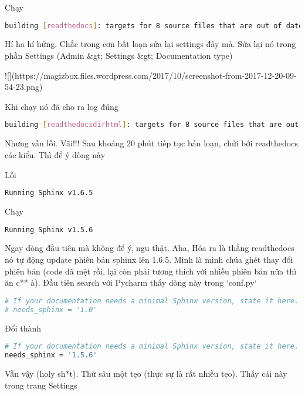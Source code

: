 Chạy

\begin{lstlisting}[language=bash]
building [readthedocs]: targets for 8 source files that are out of date
\end{lstlisting}

Hí ha hí hửng. Chắc trong cơn bất loạn sửa lại settings đây mà. Sửa lại nó trong phần Settings (Admin &gt; Settings &gt; Documentation type)

![](https://magizbox.files.wordpress.com/2017/10/screenshot-from-2017-12-20-09-54-23.png)

Khi chạy nó đã cho ra log đúng

\begin{lstlisting}[language=bash]
building [readthedocsdirhtml]: targets for 8 source files that are out of date
\end{lstlisting}

Nhưng vẫn lỗi. Vãi!!! Sau khoảng 20 phút tiếp tục bấn loạn, chửi bới readthedocs các kiểu. Thì để ý dòng này

Lỗi

\begin{lstlisting}[language=bash]
Running Sphinx v1.6.5
\end{lstlisting}


Chạy

\begin{lstlisting}[language=bash]
Running Sphinx v1.5.6
\end{lstlisting}

Ngay dòng đầu tiên mà không để ý, ngu thật. Aha, Hóa ra là thằng readthedocs nó tự động update phiên bản sphinx lên 1.6.5. Mình là mình chúa ghét thay đổi phiên bản (code đã mệt rồi, lại còn phải tương thích với nhiều phiên bản nữa thì ăn c** à). Đầu tiên search với Pycharm thấy dòng này trong `conf.py`

\begin{lstlisting}[language=bash]
# If your documentation needs a minimal Sphinx version, state it here.
# needs_sphinx = '1.0'
\end{lstlisting}

Đổi thành

\begin{lstlisting}[language=bash]
# If your documentation needs a minimal Sphinx version, state it here.
needs_sphinx = '1.5.6'
\end{lstlisting}

Vẫn vậy (holy sh*t). Thử sâu một tẹo (thực sự là rất nhiều tẹo). Thấy cái này trong trang Settings

